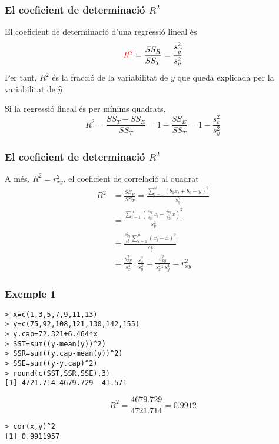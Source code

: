 \documentclass[12pt,t]{beamer}
\newcommand{\red}[1]{\textcolor{red}{#1}}
\renewcommand{\emph}[1]{{\color{red}#1}}
\theoremstyle{plain}
\theoremstyle{definition}
\begin{document}
\begin{frame}
\frametitle{El coeficient de determinació $R^2$}
El \emph{coeficient de determinació} d'una regressió lineal és
$$
\red{R^2}=\frac{SS_R}{SS_T}=\frac{s_{\widehat{y}}^2}{s_y^2}
$$
Per tant, $R^2$ és la fracció de la variabilitat de $y$ que queda explicada per la variabilitat de $\widehat{y}$
\bigskip


Si la regressió lineal és per mínims quadrats,
$$
R^2=\frac{SS_T-SS_E}{SS_T}=1-\frac{SS_E}{SS_T}=1-\frac{s_e^2}{s_y^2}
$$
\end{frame}


\begin{frame}
\frametitle{El coeficient de determinació $R^2$}
A més, \emph{$R^2=r_{xy}^2$}, el coeficient de correlació al quadrat
$$
\begin{array}{rl}
R^2 & \displaystyle =\frac{SS_R}{SS_T}=\frac{\sum\limits_{i=1}^n(b_1x_i+b_0-\overline{y})^2}{s_y^2}\\[2ex] 
& \displaystyle =\frac{\sum\limits_{i=1}^n(\frac{s_{xy}}{s_x^2}x_i-\frac{s_{xy}}{s_x^2}\overline{x})^2}{s_y^2}\\[2ex] 
& \displaystyle =\frac{\frac{s_{xy}^2}{s_x^4}\sum\limits_{i=1}^n(x_i-\overline{x})^2}{s_y^2}\\[2ex] & \displaystyle =\frac{s_{xy}^2}{s_x^4}\cdot \frac{s_x^2}{s_y^2}=\frac{s_{xy}^2}{s_x^2\cdot s_y^2}=r_{xy}^2
\end{array}
$$
\end{frame}

%
%

\begin{frame}[fragile]
\frametitle{Exemple 1}
\vspace*{-2ex}

\begin{verbatim}
> x=c(1,3,5,7,9,11,13)
> y=c(75,92,108,121,130,142,155)
> y.cap=72.321+6.464*x
> SST=sum((y-mean(y))^2)
> SSR=sum((y.cap-mean(y))^2)
> SSE=sum((y-y.cap)^2)
> round(c(SST,SSR,SSE),3)
[1] 4721.714 4679.729  41.571
\end{verbatim}
$$
R^2=\frac{4679.729}{4721.714}=0.9912
$$
\begin{verbatim}
> cor(x,y)^2
[1] 0.9911957
\end{verbatim}
\end{frame}
\end{document}
